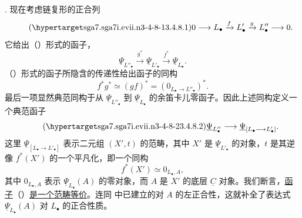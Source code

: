 

. 现在考虑链复形的正合列
\begin{equation}\tag{\SGARefTarget{sga7.sga7i.evii.n3-4-8-1}{3.4.8.1}}
 0\longrightarrow L_\bullet\xrightarrow{f}L'_\bullet
 \xrightarrow{g}L''_\bullet\longrightarrow0.
\end{equation}
它给出（）形式的函子，
\[
 \underline\Psi_{L''_\bullet}\xrightarrow{g^*}
 \underline\Psi_{L'_\bullet}\xrightarrow{f^*}
 \underline\Psi_{L_\bullet}.
\]
（）形式的函子所隐含的传递性给出函子的同构
\[
 f^*g^*\simeq(gf)^*=(0_{L_\bullet\to L''_\bullet})^*.
\]
最后一项显然典范同构于从 $\underline\Psi_{L''_\bullet}$ 到 $\underline\Psi_{L_\bullet}$ 的余笛卡儿零函子。因此上述同构定义一个典范函子
\begin{equation}\tag{\SGARefTarget{sga7.sga7i.evii.n3-4-8-2}{3.4.8.2}}
 \underline\Psi_{L''_\bullet}\longrightarrow
 \underline\Psi_{[L_\bullet\longrightarrow L'_\bullet]}.
\end{equation}
这里 $\underline\Psi_{[L_\bullet\longrightarrow L'_\bullet]}$ 表示二元组 $(X',t)$ 的范畴，其中 $X'$ 是 $\underline\Psi_{L'_\bullet}$ 的对象，$t$ 是其逆像 $f^*(X')$ 的一个平凡化，即一个同构
\[
 f^*(X')\simeq0_{L_\bullet,A},
\]
其中 $0_{L_\bullet,A}$ 表示 $\underline\Psi_{L_\bullet}(A)$ 的零对象，而 $A$ 是 $X'$ 的底层 $\underline C$ 对象。我们断言，\underline{函子}（）\underline{是一个范畴等价}。连同  中已建立的对 $A$ 的左正合性，这就补全了表达式 $\underline\Psi_{L_\bullet}(A)$ 对 $L_\bullet$ 的正合性质。

